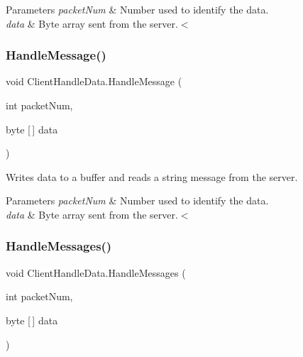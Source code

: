 \begin{DoxyParams}{Parameters}
{\em packet\+Num} & Number used to identify the data.\\
\hline
{\em data} & Byte array sent from the server.$<$\\
\hline
\end{DoxyParams}
\mbox{\label{class_client_handle_data_af0be33dc4530a4f632b6ef6d7e01f59d}} 
\subsubsection{\texorpdfstring{HandleMessage()}{HandleMessage()}}
{\footnotesize\ttfamily void Client\+Handle\+Data.\+Handle\+Message (\begin{DoxyParamCaption}\item[{int}]{packet\+Num,  }\item[{byte \mbox{[}$\,$\mbox{]}}]{data }\end{DoxyParamCaption})}



Writes data to a buffer and reads a string message from the server. 


\begin{DoxyParams}{Parameters}
{\em packet\+Num} & Number used to identify the data.\\
\hline
{\em data} & Byte array sent from the server.$<$\\
\hline
\end{DoxyParams}
\mbox{\label{class_client_handle_data_a2b973713df73e2e1bd53c70557fdcd34}} 
\subsubsection{\texorpdfstring{HandleMessages()}{HandleMessages()}}
{\footnotesize\ttfamily void Client\+Handle\+Data.\+Handle\+Messages (\begin{DoxyParamCaption}\item[{int}]{packet\+Num,  }\item[{byte \mbox{[}$\,$\mbox{]}}]{data }\end{DoxyParamCaption})\hspace{0.3cm}{\ttfamily [private]}}




